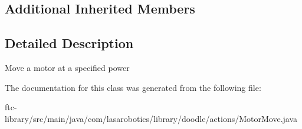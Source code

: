\subsection*{Additional Inherited Members}


\subsection{Detailed Description}
Move a motor at a specified power 

The documentation for this class was generated from the following file\+:\begin{DoxyCompactItemize}
\item 
ftc-\/library/src/main/java/com/lasarobotics/library/doodle/actions/Motor\+Move.\+java\end{DoxyCompactItemize}
